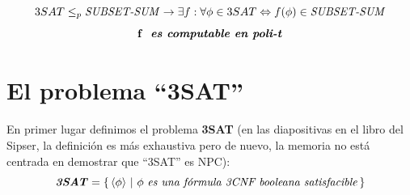 \documentclass[../main]{subfiles}
\begin{document}
\begin{equation*}
    3SAT \leq_p \text{\textit{SUBSET-SUM}} \rightarrow \exists f : \forall \phi \in 3SAT \Leftrightarrow f(\phi) \in \text{\textit{SUBSET-SUM}}
    \vspace{1mm} 
\end{equation*}
\begin{equation*}
   \textbf{ f \text{\textit{ es computable en poli-t}} }
\end{equation*}
\section{El problema ``3SAT''}
En primer lugar definimos el problema \textbf{3SAT} (en las diapositivas en el libro del Sipser, la definición es más exhaustiva pero de nuevo, la memoria no está centrada en demostrar que ``3SAT'' es NPC): 
\begin{equation*}
\text{\textit{\textbf{3SAT}}} = \{ \, \langle \phi \rangle \ | \  \phi\ \text{\textit{es una fórmula 3CNF booleana satisfacible}} \, \}
\end{equation*}
\end{document}
